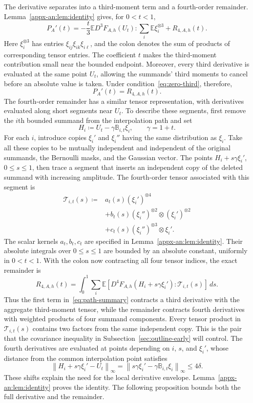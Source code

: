 \documentclass[11pt,letterpaper]{article}
\theoremstyle{remark}
\newcommand{\E}{\mathbb E}
\newcommand{\norm}[1]{\left\lVert#1\right\rVert}
\newcommand{\dd}{\,d}
\begin{document}
The derivative separates into a third-moment term and a fourth-order
remainder. Lemma~\ref{appx-an:lem:identity} gives, for \(0<t<1\),
\begin{equation}
 P_A'(t)=-\frac t3
       \E D^3F_{A,h}(U_t):\sum_i\E\xi_i^{\otimes3}
       +R_{4,A,h}(t).
 \label{eq:path-summary}
\end{equation}
Here \(\xi_i^{\otimes3}\) has entries
\(\xi_{ij}\xi_{ik}\xi_{i\ell}\), and the colon denotes the sum of
products of corresponding tensor entries. The coefficient \(t\) makes
the third-moment contribution small near the bounded endpoint.
Moreover, every third derivative is evaluated at the same point
\(U_t\), allowing the summands' third moments to cancel before an
absolute value is taken. Under condition~\eqref{eq:zero-third}, therefore,
\begin{equation}
 P_A'(t)=R_{4,A,h}(t).
 \label{zs:identity}
\end{equation}
The fourth-order remainder has a similar tensor representation, with
derivatives evaluated along short segments near \(U_t\). To describe
these segments, first remove the \(i\)th bounded summand from the
interpolation path and set
\[
 H_i\coloneqq U_t-\gamma\mathbb B_{i,t}\xi_i,
 \qquad \gamma=1+t.
\]
For each \(i\), introduce copies \(\xi_i'\) and \(\xi_i''\) having
the same distribution as \(\xi_i\). Take all these
copies to be mutually independent and independent of the original
summands, the Bernoulli masks, and the Gaussian vector. The points
\(H_i+s\gamma\xi_i'\), \(0\le s\le1\), then trace a segment that
inserts an independent copy of the deleted summand with increasing
amplitude. The fourth-order tensor associated with this segment is
\[
 \begin{aligned}
 \mathcal T_{i,t}(s)\coloneqq{}&a_t(s)(\xi_i')^{\otimes4}\\
 &+b_t(s)(\xi_i'')^{\otimes2}\otimes(\xi_i')^{\otimes2}\\
 &+c_t(s)(\xi_i'')^{\otimes3}\otimes\xi_i'.
 \end{aligned}
\]
The scalar kernels \(a_t,b_t,c_t\) are specified in
Lemma~\ref{appx-an:lem:identity}. Their absolute integrals over
\(0\le s\le1\) are bounded by an absolute constant, uniformly in
\(0<t<1\).
With the colon now contracting all four tensor indices, the exact
remainder is
\[
 R_{4,A,h}(t)=\int_0^1\sum_i\E\left[
 D^4F_{A,h}(H_i+s\gamma\xi_i'):\mathcal T_{i,t}(s)
 \right]\dd s.
\]
Thus the first term in~\eqref{eq:path-summary} contracts a third
derivative with the aggregate third-moment tensor, while the remainder
contracts fourth derivatives with weighted products of four summand
components. Every tensor product in \(\mathcal T_{i,t}(s)\) contains
two factors from the same independent copy. This is the pair that the
covariance inequality in Subsection~\ref{sec:outline-early} will control.
The fourth derivatives are evaluated at points depending on \(i\),
\(s\), and \(\xi_i'\), whose distance from the common interpolation
point satisfies
\[
 \norm{H_i+s\gamma\xi_i'-U_t}_\infty
 =\norm{s\gamma\xi_i'-\gamma\mathbb B_{i,t}\xi_i}_\infty
 \le4\delta.
\]
These shifts explain the need for the local derivative envelope.
Lemma~\ref{appx-an:lem:identity} proves the identity. The following
proposition bounds both the full derivative and the remainder.
\end{document}

